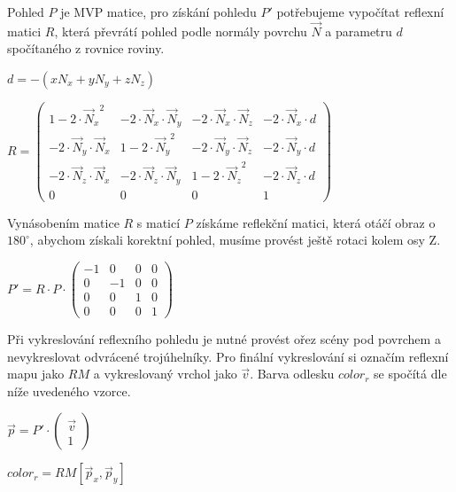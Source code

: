 \documentclass[11pt,twoside,a4paper]{book}
\begin{document}
Pohled $P$ je MVP matice, pro získání pohledu $P'$ potřebujeme vypočítat reflexní matici $R$, která převrátí pohled podle normály povrchu $\vec{N}$ a parametru $d$ spočítaného z rovnice roviny.
              
\begin{center}
$d = -(xN_x + yN_y + zN_z)$
\end{center}
\begin{center}
$R = \begin{pmatrix}
1 -2 \cdot {\vec{N}_x}^2 & -2 \cdot \vec{N}_x \cdot \vec{N}_y & -2 \cdot \vec{N}_x \cdot \vec{N}_z & -2 \cdot \vec{N}_x \cdot d\\
-2 \cdot \vec{N}_y \cdot \vec{N}_x & 1 -2 \cdot {\vec{N}_y}^2 & -2 \cdot \vec{N}_y \cdot \vec{N}_z & -2 \cdot \vec{N}_y \cdot d\\
-2 \cdot \vec{N}_z \cdot \vec{N}_x & -2 \cdot \vec{N}_z \cdot \vec{N}_y & 1 -2 \cdot {\vec{N}_z}^2 & -2 \cdot \vec{N}_z \cdot d\\
0 & 0 & 0 & 1
\end{pmatrix}$
\end{center}

Vynásobením matice $R$ s maticí $P$ získáme reflekční matici, která otáčí obraz o $180^{\circ}$, abychom získali korektní pohled, musíme provést ještě rotaci kolem osy Z.
\begin{center}
$P' = R \cdot P \cdot \begin{pmatrix}
-1 & 0 & 0 & 0\\
0 & -1 & 0 & 0\\
0 & 0 & 1 & 0\\
0 & 0 & 0 & 1
\end{pmatrix}$
\end{center}

Při vykreslování reflexního pohledu je nutné provést ořez scény pod povrchem a nevykreslovat odvrácené trojúhelníky. Pro finální vykreslování si označím reflexní mapu jako $RM$ a vykreslovaný vrchol jako $\vec{v}$. Barva odlesku $color_r$ se spočítá dle níže uvedeného vzorce.
\begin{center}
$\vec{p} = P' \cdot \begin{pmatrix}
\vec{v}\\
1
\end{pmatrix}$
\end{center}
\begin{center}
$color_r = RM[\vec{p}_x, \vec{p}_y]$
\end{center}


\end{document}
